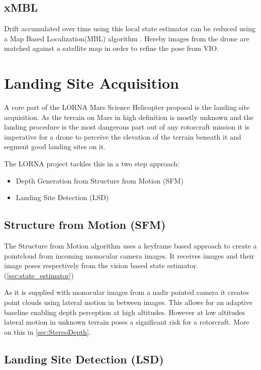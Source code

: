 \subsection{xMBL}

Drift accumulated over time using this local state estimator can be reduced using a Map Based Localization(MBL) algorithm \citep{XMBL}. Hereby images from the drone are matched against a satellite map in order to refine the pose from VIO.


\section{Landing Site Acquisition }

A core part of the LORNA Mars Science Helicopter proposal is the landing site acquisition. As the terrain on Mars in high definition is mostly unknown and the landing procedure is the most dangerous part out of any rotorcraft mission it is imperative for a drone to perceive the elevation of the terrain beneath it and segment good landing sites on it.

The LORNA project tackles this in a two step approach:

\begin{itemize}
    \item Depth Generation from Structure from Motion (SFM) \citep{SFM}
    \item Landing Site Detection (LSD) \citep{LSD1, LSD2}
\end{itemize}

\subsection{Structure from Motion (SFM)}\label{subsec:related_work:SFM}

The Structure from Motion algorithm \citep{SFM} uses a keyframe based approach to create a pointcloud from incoming monocular camera images. It receives images and their image poses respectively from the vision based state estimator. (\ref{sec:state_estimator})

As it is supplied with monocular images from a nadir pointed camera it creates point clouds using lateral motion in between images. This allows for an adaptive baseline enabling depth perception at high altitudes. However at low altitudes lateral motion in unknown terrain poses a significant risk for a rotorcraft. More on this in \cref{sec:StereoDepth}.

\subsection{Landing Site Detection (LSD)}\label{subsec:related_work:LSD}

